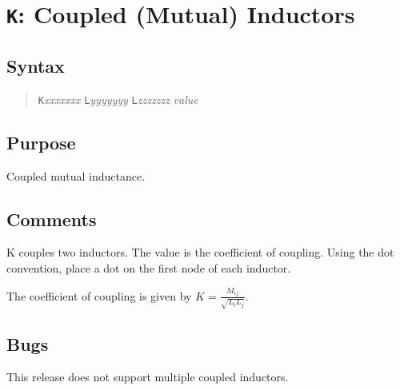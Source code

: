 \section{{\tt K}: Coupled (Mutual) Inductors}
\subsection{Syntax}
\begin{verse}
{\tt K}{\it xxxxxxx} {\tt L}{\it yyyyyyy} {\tt L}{\it zzzzzzz} {\it value}
\end{verse}
\subsection{Purpose}

Coupled mutual inductance.
\subsection{Comments}

K couples two inductors.  The value is the coefficient of coupling.  Using the dot convention, place a dot on the first node of each inductor.

The coefficient of coupling is given by $K = \frac{M_{ij}}{\sqrt{L_i L_j}}$.
\subsection{Bugs}

This release does not support multiple coupled inductors.
